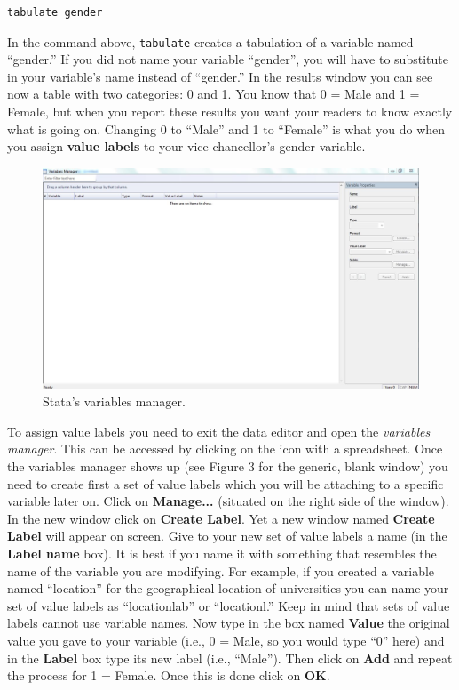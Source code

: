 \documentclass{article}
\begin{document}
\begin{lstlisting}
tabulate gender
\end{lstlisting} 

In the command above, \texttt{tabulate} creates a tabulation of a variable named ``gender.'' If you did not name your variable ``gender'', you will have to substitute in your variable's name instead of ``gender.'' In the results window you can see now a table with two categories: 0 and 1. You know that 0 = Male and 1 = Female, but when you report these results you want your readers to know exactly what is going on. Changing 0 to ``Male'' and 1 to ``Female'' is what you do when you assign \textbf{value labels} to your vice-chancellor's gender variable.

\begin{figure}[H]
	\includegraphics[width=\linewidth]{../img/stata_variables_manager.jpg}
	\caption{Stata's variables manager.}
\end{figure}

To assign value labels you need to exit the data editor and open the \textit{variables manager}. This can be accessed by clicking on the icon with a spreadsheet. Once the variables manager shows up (see Figure 3 for the generic, blank window) you need to create first a set of value labels which you will be attaching to a specific variable later on. Click on \textbf{Manage...} (situated on the right side of the window). In the new window click on \textbf{Create Label}. Yet a new window named \textbf{Create Label} will appear on screen. Give to your new set of value labels a name (in the \textbf{Label name} box). It is best if you name it with something that resembles the name of the variable you are modifying. For example, if you created a variable named ``location'' for the geographical location of universities you can name your set of value labels as ``locationlab'' or ``locationl.'' Keep in mind that sets of value labels cannot use variable names. Now type in the box named \textbf{Value} the original value you gave to your variable (i.e., 0 = Male, so you would type ``0'' here) and in the \textbf{Label} box type its new label (i.e., ``Male''). Then click on \textbf{Add} and repeat the process for 1 = Female. Once this is done click on \textbf{OK}.
\end{document}
